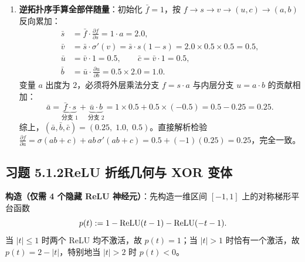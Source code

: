 \begin{enumerate}[label=(\alph*), leftmargin=1.8em]
  \item \textbf{逆拓扑序手算全部伴随量}：初始化 $\bar{f} = 1$，按 $f \to s \to v \to (u, c) \to (a, b)$ 反向累加：
  \begin{align*}
    \bar{s} &= \bar{f} \cdot \frac{\partial f}{\partial s} = 1 \cdot a = 2.0, \\
    \bar{v} &= \bar{s} \cdot \sigma'(v) = \bar{s} \cdot s(1-s) = 2.0 \times 0.5 \times 0.5 = 0.5, \\
    \bar{u} &= \bar{v} \cdot 1 = 0.5, \qquad \bar{c} = \bar{v} \cdot 1 = 0.5, \\
    \bar{b} &= \bar{u} \cdot \frac{\partial u}{\partial b} = 0.5 \times 2.0 = 1.0.
  \end{align*}
  变量 $a$ 出度为 $2$，必须将外层乘法分支 $f = s \cdot a$ 与内层分支 $u = a \cdot b$ 的贡献相加：
  \[
    \bar{a}
    = \underbrace{\bar{f} \cdot s}_{\text{分支 1}} + \underbrace{\bar{u} \cdot b}_{\text{分支 2}}
    = 1 \times 0.5 + 0.5 \times (-0.5)
    = 0.5 - 0.25 = 0.25.
  \]
  综上，$(\bar{a}, \bar{b}, \bar{c}) = (0.25,\; 1.0,\; 0.5)$。直接解析检验 $\frac{\partial f}{\partial a} = \sigma(ab+c) + a b\,\sigma'(ab+c) = 0.5 + (-1)(0.25) = 0.25$，完全一致。
\end{enumerate}

\subsection*{习题 5.1.2\quad ReLU 折纸几何与 XOR 变体}
\textbf{构造（仅需 4 个隐藏 ReLU 神经元）}：先构造一维区间 $[-1, 1]$ 上的对称梯形平台函数
\[
  p(t) := 1 - \operatorname{ReLU}(t - 1) - \operatorname{ReLU}(-t - 1).
\]
当 $|t| \le 1$ 时两个 ReLU 均不激活，故 $p(t) = 1$；当 $|t| > 1$ 时恰有一个激活，故 $p(t) = 2 - |t|$，特别地当 $|t| > 2$ 时 $p(t) < 0$。

